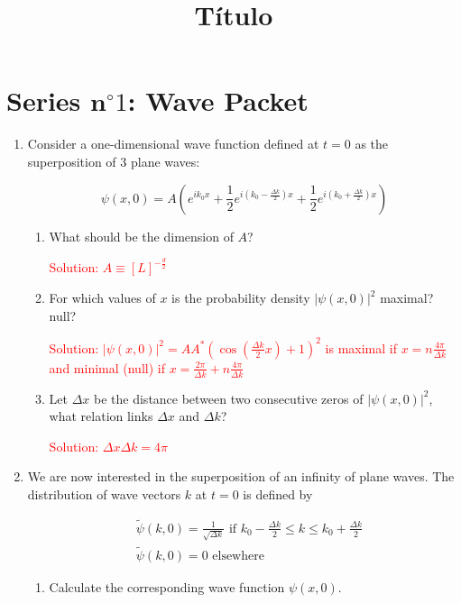 \documentclass{article}
\title{Título}
\author{}
\date{}
\begin{document}
\section*{Series $\mathbf{n}^{\circ} 1$: Wave Packet}

\begin{enumerate}
    \item Consider a one-dimensional wave function defined at $t=0$ as the superposition of 3 plane waves:

    $$
    \psi(x, 0) = A\left(e^{i k_{0} x} + \frac{1}{2} e^{i\left(k_{0}-\frac{\Delta k}{2}\right) x} + \frac{1}{2} e^{i\left(k_{0}+\frac{\Delta k}{2}\right) x}\right)
    $$

    \begin{enumerate}
        \item What should be the dimension of $A$?

        \textcolor{red}{Solution: $A \equiv [L]^{-\frac{d}{2}}$}

        \item For which values of $x$ is the probability density $|\psi(x, 0)|^{2}$ maximal? null?

        \textcolor{red}{Solution: $|\psi(x, 0)|^{2} = A A^{*}\left(\cos \left(\frac{\Delta k}{2} x\right) + 1\right)^{2}$ is maximal if $x = n \frac{4 \pi}{\Delta k}$ and minimal (null) if $x = \frac{2 \pi}{\Delta k} + n \frac{4 \pi}{\Delta k}$}

        \item Let $\Delta x$ be the distance between two consecutive zeros of $|\psi(x, 0)|^{2}$, what relation links $\Delta x$ and $\Delta k$?

        \textcolor{red}{Solution: $\Delta x \Delta k = 4 \pi$}
    \end{enumerate}

    \item We are now interested in the superposition of an infinity of plane waves. The distribution of wave vectors $k$ at $t=0$ is defined by

    $$
    \begin{aligned}
    & \tilde{\psi}(k, 0) = \frac{1}{\sqrt{\Delta k}} \text{ if } k_{0} - \frac{\Delta k}{2} \leq k \leq k_{0} + \frac{\Delta k}{2} \\
    & \tilde{\psi}(k, 0) = 0 \text{ elsewhere }
    \end{aligned}
    $$

    \begin{enumerate}
        \item Calculate the corresponding wave function $\psi(x, 0)$.


\end{enumerate}
\end{enumerate}
\end{document}
